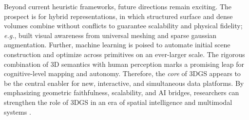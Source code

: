 \documentclass[11pt,a4paper]{article}
\begin{document}
Beyond current heuristic frameworks, future directions remain exciting. The prospect is for hybrid representations, in which structured surface \cite{arxiv:2311.12775v3,arxiv:2410.24204v3} and dense volumes combine without conflicts to guarantee scalability and physical fidelity; \emph{e.g.}, built visual awareness from universal meshing and sparse gaussian augmentation. Further, machine learning is poised to automate initial scene construction \cite{arxiv:2510.08575v3} and optimize across primitives on an ever-larger scale. The rigorous combination of 3D semantics with human perception marks a promising leap for cognitive-level mapping and autonomy. Therefore, the \emph{core} of 3DGS appears to be the central enabler for new, interactive, and simultaneous data platforms. By emphasizing geometric faithfulness, scalability, and AI bridges, researchers can strengthen the role of 3DGS in an era of spatial intelligence and multimodal systems \cite{arxiv:2402.07181v1}.
\end{document}
